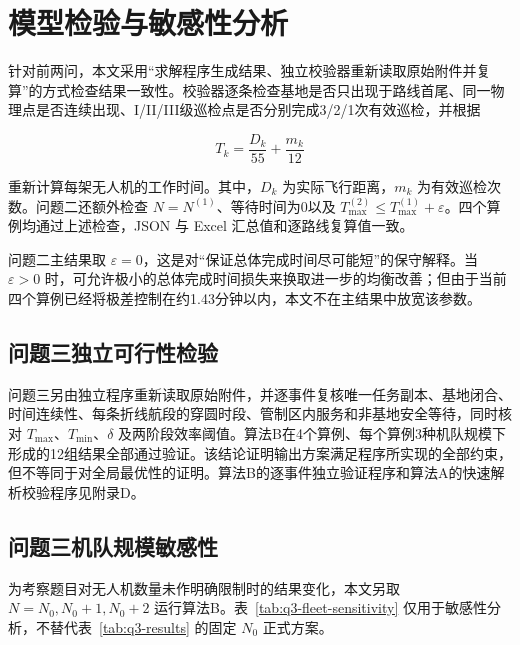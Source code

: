 \documentclass[UTF8,a4paper,12pt]{ctexart}
\numberwithin{equation}{section}
\numberwithin{equation}{section}
\begin{document}
\section{模型检验与敏感性分析}
针对前两问，本文采用“求解程序生成结果、独立校验器重新读取原始附件并复算”的方式检查结果一致性。校验器逐条检查基地是否只出现于路线首尾、同一物理点是否连续出现、I/II/III级巡检点是否分别完成3/2/1次有效巡检，并根据

\[
  T_k=\frac{D_k}{55}+\frac{m_k}{12}
\]

重新计算每架无人机的工作时间。其中，\(D_k\) 为实际飞行距离，\(m_k\) 为有效巡检次数。问题二还额外检查 \(N=N^{(1)}\)、等待时间为0以及 \(T_{\max}^{(2)}\leq T_{\max}^{(1)}+\varepsilon\)。四个算例均通过上述检查，JSON 与 Excel 汇总值和逐路线复算值一致。

问题二主结果取 \(\varepsilon=0\)，这是对“保证总体完成时间尽可能短”的保守解释。当 \(\varepsilon>0\) 时，可允许极小的总体完成时间损失来换取进一步的均衡改善；但由于当前四个算例已经将极差控制在约1.43分钟以内，本文不在主结果中放宽该参数。

\subsection{问题三独立可行性检验}

问题三另由独立程序重新读取原始附件，并逐事件复核唯一任务副本、基地闭合、时间连续性、每条折线航段的穿圆时段、管制区内服务和非基地安全等待，同时核对 $T_{\max}$、$T_{\min}$、$\delta$ 及两阶段效率阈值。算法B在4个算例、每个算例3种机队规模下形成的12组结果全部通过验证。该结论证明输出方案满足程序所实现的全部约束，但不等同于对全局最优性的证明。算法B的逐事件独立验证程序和算法A的快速解析校验程序见附录D。

\subsection{问题三机队规模敏感性}

为考察题目对无人机数量未作明确限制时的结果变化，本文另取 $N=N_0,N_0+1,N_0+2$ 运行算法B。表~\ref{tab:q3-fleet-sensitivity} 仅用于敏感性分析，不替代表~\ref{tab:q3-results} 的固定 $N_0$ 正式方案。
\end{document}
